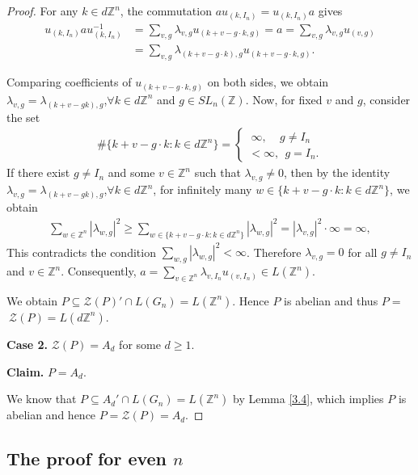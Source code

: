 \documentclass[12pt]{amsart}
\theoremstyle{definition}
\theoremstyle{remark}
\begin{document}
\begin{proof}
For any $k\in d\mathbb{Z}^n$, the commutation $au_{(k,I_{n})} = u_{(k,I_{n})}a$ gives
\begin{align*}
    u_{(k,I_{n})}au_{(k,I_{n})}^{-1}&=\sum\limits_{v,g}\lambda_{v,g}u_{(k+v-g\cdot k,g)}=a=\sum\limits_{v,g}\lambda_{v,g}u_{(v,g)}\\
    &=\sum\limits_{v,g}\lambda_{(k+v-g\cdot k),g}u_{(k+v-g\cdot k,g)}.
\end{align*}

Comparing coefficients of $u_{(k+v-g\cdot k,g)}$ on both sides, we obtain $\lambda_{v,g}=\lambda_{(k+v-gk),g}$,$\forall k\in d\mathbb{Z}^n$ and $g\in SL_n(\mathbb{Z})$. Now, for fixed $v$ and $g$, consider the set
\begin{align*}
    \#\{k+v-g\cdot k:k\in d\mathbb{Z}^n\}=\begin{cases}
        \ \infty, \ \ \ \ \ g\ne I_{n}\\
        <\infty,\ \ g=I_{n}.
    \end{cases}
\end{align*}
If there exist $g\ne I_{n}$ and some $v\in \mathbb{Z}^n$ such that $\lambda_{v,g} \ne 0$, then by the identity $\lambda_{v,g}=\lambda_{(k+v-gk),g}$,$\forall k\in d\mathbb{Z}^n$, for infinitely many $w\in \{k+v-g\cdot k:k\in d\mathbb{Z}^n\}$, we obtain 
\begin{align*}
    \sum_{w\in \mathbb{Z}^n}|\lambda_{w,g}|^2 \ge \sum\limits_{w\in\{k+v-g\cdot k:k\in d\mathbb{Z}^n\}} |\lambda_{w,g}|^2 = |\lambda_{v,g}|^2\cdot\infty =\infty,
\end{align*}
This contradicts the condition $\sum\limits_{w,g}|\lambda_{w,g}|^2<\infty$. Therefore $\lambda_{v,g} = 0$ for all $g\ne I_{n}$ and $v\in\mathbb{Z}^n$. Consequently, $a = \sum\limits_{v\in \mathbb{Z}^n}\lambda_{v,I_{n}}u_{(v,I_{n})}\in L(\mathbb{Z}^n)$. 

We obtain $P\subseteq \mathcal{Z}(P)' \cap L(G_{n}) = L(\mathbb{Z}^n)$. Hence $P$ is abelian and thus $P =$$~\mathcal{Z}(P) = L(d\mathbb{Z}^n)$.


\textbf{Case 2.} $\mathcal{Z}(P) = A_{d}$ for some $d\ge1$.

\textbf{Claim.} $P=A_d$.

We know that $P\subseteq A_d' \cap L(G_{n}) = L(\mathbb{Z}^n)$ by Lemma \ref{3.4}, which implies $P$ is abelian and hence $P=\mathcal{Z}(P) = A_d$.
\end{proof}



\subsection{The proof for even $n$}
\end{document}
